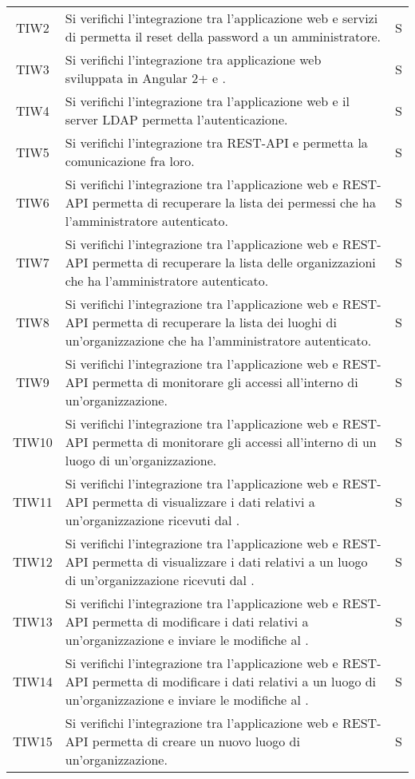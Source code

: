 {\begin{longtable}{ c C{13cm} C{1cm}}
TIW2 & Si verifichi l’integrazione tra l’applicazione web e servizi di  permetta il reset della password a un amministratore. & S \\
TIW3 & Si verifichi l’integrazione tra applicazione web sviluppata in Angular 2+ e .& S \\
TIW4 & Si verifichi l’integrazione tra l’applicazione web e il server LDAP permetta l’autenticazione.& S \\
TIW5 & Si verifichi l’integrazione tra REST-API e  permetta la comunicazione fra loro.& S \\
TIW6 & Si verifichi l’integrazione tra l’applicazione web e REST-API permetta di recuperare la lista dei permessi che ha l’amministratore autenticato.& S \\
TIW7 & Si verifichi l’integrazione tra l’applicazione web e REST-API permetta di recuperare la lista delle organizzazioni che ha l’amministratore autenticato.& S \\
TIW8 & Si verifichi l’integrazione tra l’applicazione web e REST-API permetta di recuperare la lista dei luoghi di un’organizzazione che ha l’amministratore autenticato.& S \\
TIW9 & Si verifichi l’integrazione tra l’applicazione web e REST-API permetta di monitorare gli accessi all’interno di un’organizzazione.& S \\
TIW10 & Si verifichi l’integrazione tra l’applicazione web e REST-API permetta di monitorare gli accessi all’interno di un luogo di un’organizzazione.& S \\
TIW11 & Si verifichi l’integrazione tra l’applicazione web e REST-API permetta di visualizzare i dati relativi a un’organizzazione ricevuti dal .& S \\
TIW12 & Si verifichi l’integrazione tra l’applicazione web e REST-API permetta di visualizzare i dati relativi a un luogo di un’organizzazione ricevuti dal .& S \\
TIW13 & Si verifichi l’integrazione tra l’applicazione web e REST-API permetta di modificare i dati relativi a un’organizzazione e inviare le modifiche al .& S \\
TIW14 & Si verifichi l’integrazione tra l’applicazione web e REST-API permetta di modificare i dati relativi a un luogo di un’organizzazione e inviare le modifiche al .& S \\
TIW15 & Si verifichi l’integrazione tra l’applicazione web e REST-API permetta di creare un nuovo luogo di un’organizzazione.& S \\

\end{longtable}}
